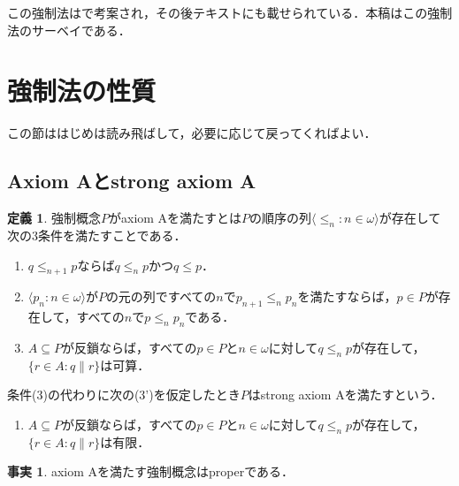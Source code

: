\documentclass[uplatex]{jsarticle}
\newcommand{\seq}[1]{{\langle#1\rangle}}
\renewcommand\subset{\subseteq}
\theoremstyle{definition}
\newtheorem{defi}[thm]{定義}
\newtheorem{fact}[thm]{事実}
\begin{document}
		この強制法は\cite{bjs}で考案され，その後テキスト\cite{bartoszynski1995set}にも載せられている．本稿はこの強制法のサーベイである．
	
	
	\section{強制法の性質}
	
	この節ははじめは読み飛ばして，必要に応じて戻ってくればよい．
	
	\subsection{Axiom Aとstrong axiom A}
	
	\begin{defi}
		強制概念$P$がaxiom Aを満たすとは$P$の順序の列$\seq{ \le_n : n \in \omega}$が存在して次の3条件を満たすことである．
		\begin{enumerate}[(1)]
			\item $q \le_{n+1} p$ならば$q \le_n p$かつ$q \le p$．
			\item $\seq{p_n : n \in \omega}$が$P$の元の列ですべての$n$で$p_{n+1} \le_n p_n$を満たすならば，$p \in P$が存在して，すべての$n$で$p \le_n p_n$である．
			\item $A \subset P$が反鎖ならば，すべての$p \in P$と$n \in \omega$に対して$q \le_n p$が存在して，$\{ r \in A : q \parallel r  \}$は可算．
		\end{enumerate}
		条件(3)の代わりに次の(3')を仮定したとき$P$はstrong axiom Aを満たすという．
		\begin{enumerate}[(3')]
			\item $A \subset P$が反鎖ならば，すべての$p \in P$と$n \in \omega$に対して$q \le_n p$が存在して，$\{ r \in A : q \parallel r  \}$は有限．
	\end{enumerate}

	\end{defi}

	\begin{fact}
		axiom Aを満たす強制概念はproperである．
	\end{fact}
\end{document}

